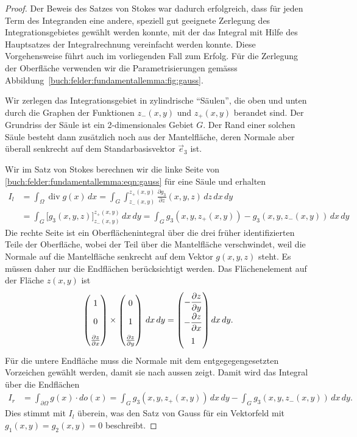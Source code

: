 \begin{proof}
Der Beweis des Satzes von Stokes war dadurch erfolgreich, dass für jeden
Term des Integranden eine andere, speziell gut geeignete Zerlegung
des Integrationsgebietes gewählt werden konnte, mit der das Integral
mit Hilfe des Hauptsatzes der Integralrechnung vereinfacht werden konnte.
Diese Vorgehensweise führt auch im vorliegenden Fall zum Erfolg.
Für die Zerlegung der Oberfläche verwenden wir die Parametrisierungen
gemässs Abbildung~\ref{buch:felder:fundamentallemma:fig:gauss}.

Wir zerlegen das Integrationsgebiet in zylindrische ``Säulen'', die
oben und unten durch die Graphen der Funktionen $z_-(x,y)$ und $z_+(x,y)$ 
berandet sind.
Der Grundriss der Säule ist ein 2-dimensionales Gebiet $G$.
Der Rand einer solchen Säule besteht dann zusätzlich noch aus der
Mantelfläche, deren Normale aber überall senkrecht auf dem Standarbasisvektor
$\vec{e}_3$ ist.

Wir im Satz von Stokes berechnen wir die linke Seite von
\eqref{buch:felder:fundamentallemma:eqn:gauss} für eine Säule und erhalten
\begin{align*}
I_l
&=
\int_\Omega \operatorname{div}g(x)\,dx
=
\int_{G}\int_{z_-(x,y)}^{z_+(x,y)}
\frac{\partial g_3}{\partial z}(x,y,z)
\,dz\,dx\,dy
\\
&=
\int_G \biggl[ g_3(x,y,z)\biggr]_{z_-(x,y)}^{z_+(x,y)}\,dx\,dy
=
\int_G g_3(x,y,z_+(x,y)) - g_3(x,y,z_-(x,y)) \,dx\,dy
\end{align*}
Die rechte Seite ist ein Oberflächenintegral über die drei früher
identifizierten Teile der Oberfläche, wobei der Teil über die Mantelfläche
verschwindet, weil die Normale auf die Mantelfläche senkrecht auf dem
Vektor $g(x,y,z)$ steht.
Es müssen daher nur die Endflächen berücksichtigt werden.
Das Flächenelement auf der Fläche $z(x,y)$ ist 
\[
\begin{pmatrix}
1\\
0\\
\frac{\partial z}{\partial x}
\end{pmatrix}
\times
\begin{pmatrix}
0\\
1\\
\frac{\partial z}{\partial y}
\end{pmatrix}
\,dx\,dy
=
{\renewcommand{\arraystretch}{1.8}
\begin{pmatrix}
\displaystyle
-\frac{\partial z}{\partial y}\\
\displaystyle
-\frac{\partial z}{\partial x}\\
1
\end{pmatrix}}
\,dx\,dy.
\]
Für die untere Endfläche muss die Normale mit dem entgegegengesetzten 
Vorzeichen gewählt werden, damit sie nach aussen zeigt.
Damit wird das Integral über die Endflächen
\begin{align*}
I_r
&=
\int_{\partial\Omega} g(x) \cdot do(x)
=
\int_{G} g_3(x,y,z_+(x,y)) \,dx\,dy
-
\int_{G} g_3(x,y,z_-(x,y)) \,dx\,dy.
\end{align*}
Dies stimmt mit $I_l$ überein, was den Satz von Gauss für ein
Vektorfeld mit $g_1(x,y)=g_2(x,y)=0$ beschreibt.


\end{proof}
